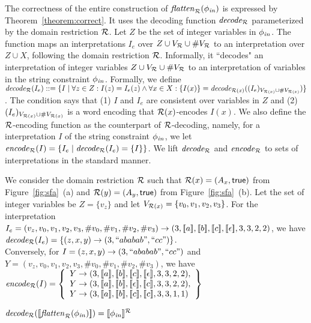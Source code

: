 \documentclass[sigplan,screen]{acmart}
\begin{document}
The correctness of the entire construction of $\mathit{flatten}_{\mathcal{R}}(\phi_{\mathit{in}})$ is expressed by  Theorem~\ref{theorem:correct}. 
It uses the decoding function $\mathit{decode_{\mathcal{R}}}$ parameterized by the domain restriction $\mathcal{R}$. 
Let $Z$ be the set of integer variables in $\phi_{\mathit{in}}$.
The function maps an interpretations $I_e$ over $Z\cup V_{\mathcal{R}}\cup\#V_{\mathcal{R}}$
to an interpretation over $Z \cup X$, following the domain restriction $\mathcal{R}$. Informally, it ``decodes" an interpretation of integer variables $Z\cup V_{\mathcal{R}}\cup\#V_{\mathcal{R}}$ to an interpretation of variables in the string constraint $\phi_{\mathit{in}}$. Formally,
we define $\mathit{decode_{\mathcal{R}}} (I_e) ::= \{I \mid \forall z\in Z: I(z) = I_e(z) \wedge\forall x\in X: \{I(x)\} = \mathit{decode_{\mathcal{R}(x)}} ((I_e)_{V_{\mathcal{R}(x)}\cup \#V_{\mathcal{R}(x)}})\}$.
The condition says that (1) $I$ and $I_e$ are consistent over variables in $Z$ and (2) $(I_e)_{V_{\mathcal{R}(x)}\cup \#V_{\mathcal{R}(x)}}$ is a word encoding that $\mathcal{R}(x)$-encodes $I(x)$.
We also define the $\mathcal{R}$-encoding function as the counterpart of $\mathcal{R}$-decoding,  
%
namely, for a interpretation $I$ of the string constraint $\phi_{\mathit{in}}$,  
we let $\mathit{encode}_{\mathcal{R}} (I) =\{I_e\mid \mathit{decode_{\mathcal{R}}} (I_e) = \{I\} \}$.
We lift $\mathit{decode_{\mathcal{R}}}$ and $\mathit{encode}_{\mathcal{R}}$ to sets of interpretations in the standard manner.
\begin{example}
We consider the domain restriction $\mathcal{R}$ such that $\mathcal{R}(x)	 =(A_x,\mbox{$\mathsf{true}$})$ from Figure~\ref{fig:sfa}~(a) and $\mathcal{R}(y) = (A_y,\mbox{$\mathsf{true}$})$ from Figure~\ref{fig:sfa}~(b). 
Let the set of integer variables be $Z=\{v_z\}$ and let $V_{\mathcal{R}(x)} =\{v_0, v_1,v_2,v_3\}$. 
For the interpretation $I_e =(v_z,v_0,v_1,v_2,v_3,\#v_0,\#v_1,\#v_2,\#v_3) \rightarrow (3,\semof{a}, \semof{b}, \semof{c},\semof{\epsilon},3,3,2,2)$, we have $\mathit{decode_{\mathcal{R}}} (I_e) = \{(z,x,y) \rightarrow(3, ``ababab",``cc") \}$.\\ 
Conversely, for $I=(z,x,y) \rightarrow(3, ``ababab",``cc")$ and $Y=(v_z,v_0,v_1,v_2,v_3,\#v_0,\#v_1,\#v_2,\#v_3)$, we have $\encode \dr (I) =\left\{ 
\begin{array}{l}
Y \rightarrow (3,\semof{a}, \semof{b}, \semof{c},\semof{\epsilon},3,3,2,2), \\
Y \rightarrow (3,\semof{a}, \semof{b},\semof{\epsilon}, \semof{c},3,3,2,2), \\
Y\rightarrow (3,\semof{a}, \semof{b},\semof{c},\semof{c},3,3,1,1)
\end{array}
 \right\}$
\end{example}

\begin{theorem}\label{theorem:correct}
$\mathit{decode_{\mathcal{R}}} ([\![\mathit{flatten}_{\mathcal{R}}(\phi_{\mathit{in}})]\!]) = [\![\phi_{\mathit{in}}]\!]^{\mathcal{R}}$ 
\end{theorem}
\end{document}
